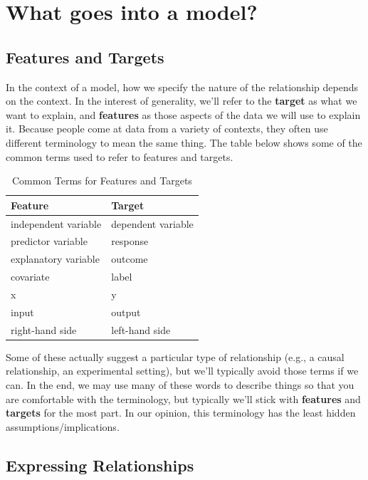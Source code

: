 \documentclass[
  letterpaper,
]{krantz}
\begin{document}
\section{What goes into a model?}\label{what-goes-into-a-model}

\subsection{Features and Targets}\label{features-and-targets}

In the context of a model, how we specify the nature of the relationship
depends on the context. In the interest of generality, we'll refer to
the \textbf{target} as what we want to explain, and \textbf{features} as
those aspects of the data we will use to explain it. Because people come
at data from a variety of contexts, they often use different terminology
to mean the same thing. The table below shows some of the common terms
used to refer to features and targets.

\hypertarget{tbl-feature-target-names}{}
\begin{longtable}{ll}
\caption{\label{tbl-feature-target-names}Common Terms for Features and Targets }\tabularnewline

\toprule
Feature & Target \\ 
\midrule\addlinespace[2.5pt]
independent variable & dependent variable \\ 
predictor variable & response \\ 
explanatory variable & outcome \\ 
covariate & label \\ 
x & y \\ 
input & output \\ 
right-hand side & left-hand side \\ 
\bottomrule
\end{longtable}

Some of these actually suggest a particular type of relationship (e.g.,
a causal relationship, an experimental setting), but we'll typically
avoid those terms if we can. In the end, we may use many of these words
to describe things so that you are comfortable with the terminology, but
typically we'll stick with \textbf{features} and \textbf{targets} for
the most part. In our opinion, this terminology has the least hidden
assumptions/implications.

\subsection{Expressing Relationships}\label{expressing-relationships}
\end{document}
